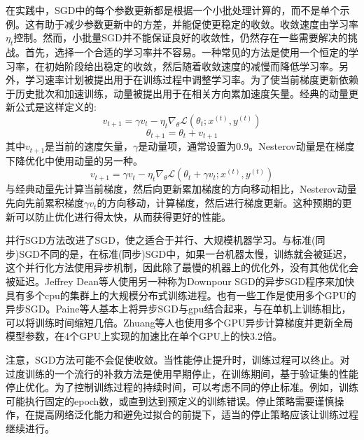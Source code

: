 \documentclass[final]{cvpr}
\begin{document}
在实践中，SGD中的每个参数更新都是根据一个小批处理计算的，而不是单个示例。这有助于减少参数更新中的方差，并能促使更稳定的收敛。收敛速度由学习率$\eta_t$控制。然而，小批量SGD并不能保证良好的收敛性，仍然存在一些需要解决的挑战。首先，选择一个合适的学习率并不容易。一种常见的方法是使用一个恒定的学习率，在初始阶段给出稳定的收敛，然后随着收敛速度的减慢而降低学习率。另外，学习速率计划被提出用于在训练过程中调整学习率。为了使当前梯度更新依赖于历史批次和加速训练，动量被提出用于在相关方向累加速度矢量。经典的动量更新公式是这样定义的:
\begin{equation}
	v_{t+1} = \gamma v_t-\eta_t\nabla_\theta\mathcal{L}(\theta_t;x^{(t)},y^{(t)})
\end{equation}
\begin{equation}
	\theta_{t+1} = \theta_t+v_{t+1}
\end{equation}
其中$v_{t+1}$是当前的速度矢量，$\gamma$是动量项，通常设置为0.9。Nesterov动量是在梯度下降优化中使用动量的另一种。
\begin{equation}
	v_{t+1} = \gamma v_t-\eta_t\nabla_\theta\mathcal{L}(\theta_t+\gamma v_t;x^{(t)},y^{(t)})
\end{equation}
与经典动量先计算当前梯度，然后向更新累加梯度的方向移动相比，Nesterov动量先向先前累积梯度$\gamma v_t$的方向移动，计算梯度，然后进行梯度更新。这种预期的更新可以防止优化进行得太快，从而获得更好的性能。

并行SGD方法改进了SGD，使之适合于并行、大规模机器学习。与标准(同步)SGD不同的是，在标准(同步)SGD中，如果一台机器太慢，训练就会被延迟，这个并行化方法使用异步机制，因此除了最慢的机器上的优化外，没有其他优化会被延迟。Jeffrey Dean等人使用另一种称为Downpour SGD的异步SGD程序来加快具有多个cpu的集群上的大规模分布式训练进程。也有一些工作是使用多个GPU的异步SGD。Paine等人基本上将异步SGD与gpu结合起来，与在单机上训练相比，可以将训练时间缩短几倍。Zhuang等人也使用多个GPU异步计算梯度并更新全局模型参数，在4个GPU上实现的加速比在单个GPU上的快3.2倍。

注意，SGD方法可能不会促使收敛。当性能停止提升时，训练过程可以终止。对过度训练的一个流行的补救方法是使用早期停止，在训练期间，基于验证集的性能停止优化。为了控制训练过程的持续时间，可以考虑不同的停止标准。例如，训练可能执行固定的epoch数，或直到达到预定义的训练错误。停止策略需要谨慎操作，在提高网络泛化能力和避免过拟合的前提下，适当的停止策略应该让训练过程继续进行。
\end{document}
